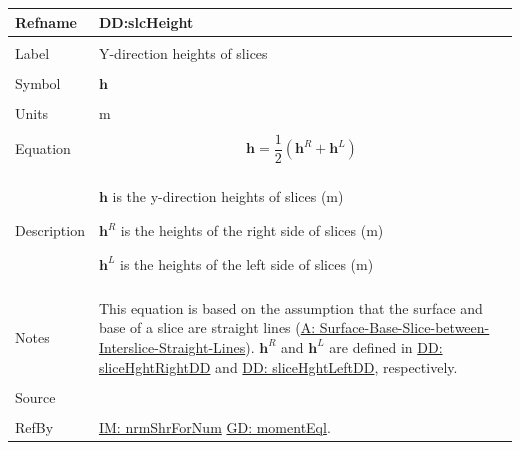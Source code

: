 \documentclass[12pt]{article}
\begin{document}
\noindent \begin{minipage}{\textwidth}
\begin{tabular}{p{} p{}}
\toprule \textbf{Refname} & \textbf{DD:slcHeight}
\label{DD:slcHeight}
\\ \midrule \\
Label & Y-direction heights of slices
\\ \midrule \\
Symbol & $\mathbf{h}$
\\ \midrule \\
Units & m
\\ \midrule \\
Equation & \begin{displaymath}
           \mathbf{h}=\frac{1}{2} \left({\mathbf{h}^{R}}+{\mathbf{h}^{L}}\right)
           \end{displaymath}
\\ \midrule \\
Description & \begin{symbDescription}
              \item{$\mathbf{h}$ is the y-direction heights of slices (m)}
              \item{${\mathbf{h}^{R}}$ is the heights of the right side of slices (m)}
              \item{${\mathbf{h}^{L}}$ is the heights of the left side of slices (m)}
              \end{symbDescription}
\\ \midrule \\
Notes & This equation is based on the assumption that the surface and base of a slice are straight lines (\hyperref[assumpSBSBISL]{A: Surface-Base-Slice-between-Interslice-Straight-Lines}).
        ${\mathbf{h}^{R}}$ and ${\mathbf{h}^{L}}$ are defined in \hyperref[DD:sliceHghtRightDD]{DD: sliceHghtRightDD} and \hyperref[DD:sliceHghtLeftDD]{DD: sliceHghtLeftDD}, respectively.
\\ \midrule \\
Source & \cite{fredlund1977}
\\ \midrule \\
RefBy & \hyperref[IM:nrmShrForNum]{IM: nrmShrForNum} \hyperref[GD:momentEql]{GD: momentEql}.
\\ \bottomrule \end{tabular}
\end{minipage}
\par~
\end{document}
